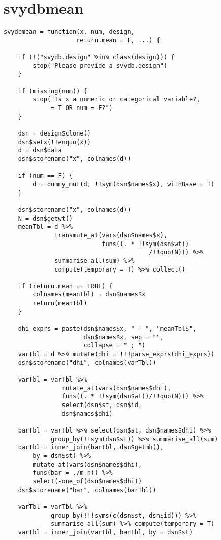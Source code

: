 \section{svydbmean}

\begin{lstlisting}
svydbmean = function(x, num, design, 
                    return.mean = F, ...) {

    if (!("svydb.design" %in% class(design))) {
        stop("Please provide a svydb.design")
    }

    if (missing(num)) {
        stop("Is x a numeric or categorical variable?, 
             = T OR num = F?")
    }

    dsn = design$clone()
    dsn$setx(!!enquo(x))
    d = dsn$data
    dsn$storename("x", colnames(d))

    if (num == F) {
        d = dummy_mut(d, !!sym(dsn$names$x), withBase = T)
    }

    dsn$storename("x", colnames(d))
    N = dsn$getwt()
    meanTbl = d %>% 
              transmute_at(vars(dsn$names$x), 
                           funs((. * !!sym(dsn$wt))
                                        /!!quo(N))) %>% 
              summarise_all(sum) %>%
              compute(temporary = T) %>% collect()

    if (return.mean == TRUE) {
        colnames(meanTbl) = dsn$names$x
        return(meanTbl)
    }

    dhi_exprs = paste(dsn$names$x, " - ", "meanTbl$", 
                      dsn$names$x, sep = "", 
                      collapse = " ; ")
    varTbl = d %>% mutate(dhi = !!!parse_exprs(dhi_exprs))
    dsn$storename("dhi", colnames(varTbl))

    varTbl = varTbl %>% 
                mutate_at(vars(dsn$names$dhi), 
                funs((. * !!sym(dsn$wt))/!!quo(N))) %>% 
                select(dsn$st, dsn$id,
                dsn$names$dhi)

    barTbl = varTbl %>% select(dsn$st, dsn$names$dhi) %>% 
             group_by(!!sym(dsn$st)) %>% summarise_all(sum)
    barTbl = inner_join(barTbl, dsn$getmh(), 
        by = dsn$st) %>% 
        mutate_at(vars(dsn$names$dhi),
        funs(bar = ./m_h)) %>%
        select(-one_of(dsn$names$dhi))
    dsn$storename("bar", colnames(barTbl))

    varTbl = varTbl %>% 
             group_by(!!!syms(c(dsn$st, dsn$id))) %>% 
             summarise_all(sum) %>% compute(temporary = T)
    varTbl = inner_join(varTbl, barTbl, by = dsn$st)


\end{lstlisting}
